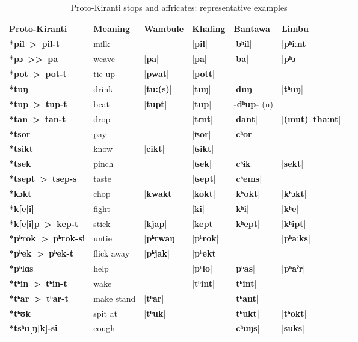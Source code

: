 \documentclass[oneside,a4paper,11pt]{article}
\newcommand{\ipa}[1]{\textbf{{\phon\mbox{#1}}}} %
\newcommand{\dhat}[1]{|\ipa{#1}|}
\begin{document}
\begin{table}
\caption{Proto-Kiranti stops and affricates: representative examples} \centering \label{tab:stops.ex}
\begin{tabular}{lllllll}
\toprule
Proto-Kiranti & Meaning & Wambule & Khaling & Bantawa & Limbu\\
\midrule
\ipa{*pil > pil-t} &	milk &	&	\dhat{pil} &	\dhat{bʰil} &	\dhat{pʰiːnt} &	\\
\ipa{*pɔ >{}> pa} &	weave &	\dhat{pa} &	\dhat{pa} &	\dhat{ba} &	\dhat{pʰɔ} &	\\
\ipa{*pot > pot-t} &	tie up &	\dhat{pwat} &	\dhat{pott} &	&	&	\\
\midrule			
\ipa{*tuŋ} &	drink &	\dhat{tu:(s)} &	\dhat{tuŋ} &	\dhat{duŋ} &	\dhat{tʰuŋ} &	\\
\ipa{*tup > tup-t} &	beat &	\dhat{tupt} &	\dhat{tup} &	\ipa{-dʰup-} (n)&	&	\\
\ipa{*tan > tan-t} &	drop &	&	\dhat{tɛnt} &	\dhat{dant} &	\dhat{(mut) thaːnt} &	\\
\midrule				
\ipa{*tsor} &	pay &	&	\dhat{ʦor} &	\dhat{cʰor} &	&	\\
\ipa{*tsikt} &	know &	\dhat{cikt} &	\dhat{ʦikt} &	&	&	\\
\ipa{*tsek} &	pinch &	 &	\dhat{ʦek} &	\dhat{cʰɨk} &	\dhat{sekt} &	\\
\ipa{*tsept > tsep-s} &	taste &	&	\dhat{ʦept} &	\dhat{cʰems} &	&	\\
\midrule
\ipa{*kɔkt} &	chop &	\dhat{kwakt} &	\dhat{kokt} &	\dhat{kʰokt} &	\dhat{kʰɔkt} &	\\
\ipa{*k[e|i]} &	fight &	&	\dhat{ki} &	\dhat{kʰi} &	\dhat{kʰe} &	\\
\ipa{*k[e|i]p > kep-t } &	stick &	\dhat{kjap} &	\dhat{kept} &	\dhat{kʰept} &	\dhat{kʰipt} &	\\
\midrule				
\ipa{*pʰrok > pʰrok-si} &	untie &	\dhat{pʰrwaŋ} &	\dhat{pʰrok} &	&	\dhat{pʰaːks} &	\\
\ipa{*pʰek > pʰek-t} &	flick away &	\dhat{pʰjak} &	\dhat{pʰekt} &	&	 &	\\
\ipa{*pʰlɑs} &	help &	&	\dhat{pʰlo} &	\dhat{pʰas} &	\dhat{pʰaˀr} &	\\
\midrule				
\ipa{*tʰin > tʰin-t} &	wake &	&	\dhat{tʰint} &	\dhat{tʰint} &	&	\\
\ipa{*tʰar > tʰar-t} &	make stand &	\dhat{tʰar} &	&	\dhat{tʰant} &	&	\\
\ipa{*tʰʊk} &	spit at &	\dhat{tʰuk} &	&	\dhat{tʰukt} &	\dhat{tʰokt} &	\\
\midrule		
\ipa{*tsʰu[ŋ|k]-si} &	cough &	&	&	\dhat{cʰuŋs} &	\dhat{suks} &	\\

\end{tabular}
\end{table}
\end{document}
